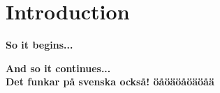 \chapter{Introduction}
\label{chapter:intro}

\textbf{So it begins...}\\

\newpage

\textbf{And so it continues...}\\

\textbf{Det funkar på svenska också! öåöäöåöäöåä}\\
